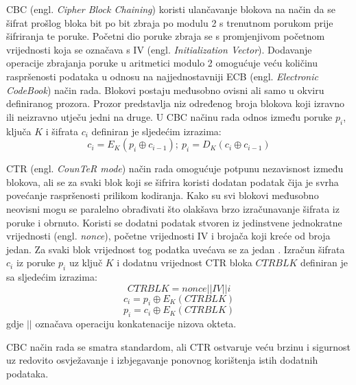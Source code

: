 CBC (engl. \emph{Cipher Block Chaining}) koristi ulančavanje
blokova na način da se šifrat prošlog bloka bit po bit zbraja po modulu 2 s
trenutnom porukom prije šifriranja te poruke. Početni dio poruke zbraja se s
promjenjivom početnom vrijednosti koja se označava s IV (engl.
\emph{Initialization Vector}). Dodavanje operacije zbrajanja poruke u aritmetici
modulo 2 omogućuje veću količinu raspršenosti podataka u odnosu na
najjednostavniji ECB (engl. \emph{Electronic CodeBook}) način rada. Blokovi
postaju međusobno ovisni ali samo u okviru definiranog prozora. Prozor
predstavlja niz određenog broja blokova koji izravno ili neizravno utječu jedni
na druge. U CBC
načinu rada odnos između poruke $p_i$, ključa $K$ i šifrata $c_i$ definiran je
sljedećim izrazima:
$$c_i=E_K(p_i \oplus c_{i-1});\ p_i=D_K(c_i \oplus c_{i-1})$$

CTR (engl. \emph{CounTeR mode}) način rada omogućuje potpunu nezavisnost između
blokova, ali se za svaki blok koji se šifrira koristi dodatan podatak čija je
svrha povećanje raspršenosti prilikom kodiranja. Kako su svi blokovi međusobno
neovisni mogu se paralelno obrađivati što olakšava brzo izračunavanje šifrata iz
poruke i obrnuto. Koristi se dodatni podatak stvoren iz jedinstvene jednokratne
vrijednosti (engl. \emph{nonce}), početne vrijednosti IV i brojača koji kreće od
broja jedan. Za svaki blok vrijednost tog podatka uvećava se za jedan
\cite{rfc3686}. Izračun šifrata $c_i$ iz poruke $p_i$ uz ključ $K$ i dodatnu
vrijednost CTR bloka $CTRBLK$ definiran je sa sljedećim izrazima:
$$CTRBLK = nonce || IV || i$$
$$c_i = p_i \oplus E_K(CTRBLK)$$
$$p_i = c_i \oplus E_K(CTRBLK)$$
gdje $||$ označava operaciju konkatenacije nizova okteta.

CBC način rada se smatra standardom, ali CTR ostvaruje veću
brzinu i sigurnost uz redovito osvježavanje i izbjegavanje ponovnog korištenja
istih dodatnih podataka.

